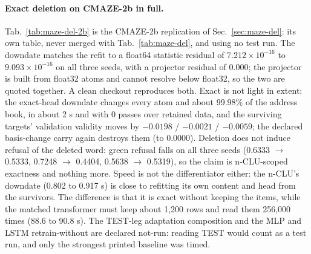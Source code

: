 \documentclass{article} %
\newcommand{\sci}[2]{\ensuremath{#1\times10^{#2}}}
\begin{document}
\paragraph{Exact deletion on CMAZE-2b in full.} Tab.~\ref{tab:maze-del-2b} is the CMAZE-2b
replication of Sec.~\ref{sec:maze-del}: its own table, never merged with Tab.~\ref{tab:maze-del}, and
using no test run.
The downdate matches the refit to a float64 statistic residual of \sci{7.212}{-16} to
\sci{9.093}{-16} on all three seeds, with a projector residual of 0.000; the projector is built
from float32 atoms and cannot resolve below float32, so the two are quoted together. A clean
checkout reproduces both. Exact is not light in extent: the exact-head downdate changes every atom
and about 99.98\% of the address book, in about 2 s and with 0 passes over retained data, and the
surviving targets' validation validity moves by $-0.0198$ / $-0.0021$ / $-0.0059$; the
declared basis-change carry again destroys them (to 0.0000). Deletion does not induce refusal
of the deleted word: green refusal falls on all three seeds (0.6333 $\to$ 0.5333, 0.7248 $\to$
0.4404, 0.5638 $\to$ 0.5319), so the claim is n-CLU-scoped exactness and nothing more. Speed is not
the differentiator either: the n-CLU's downdate (0.802 to 0.917 s) is close to refitting its own
content and head from the survivors. The difference is that it is exact without keeping the items,
while the matched transformer must keep about 1,200 rows and read them 256,000 times (88.6 to
90.8 s). The TEST-leg adaptation composition and the MLP and LSTM retrain-without are declared
not-run: reading TEST would count as a test run, and only the strongest printed baseline was timed.
\end{document}
